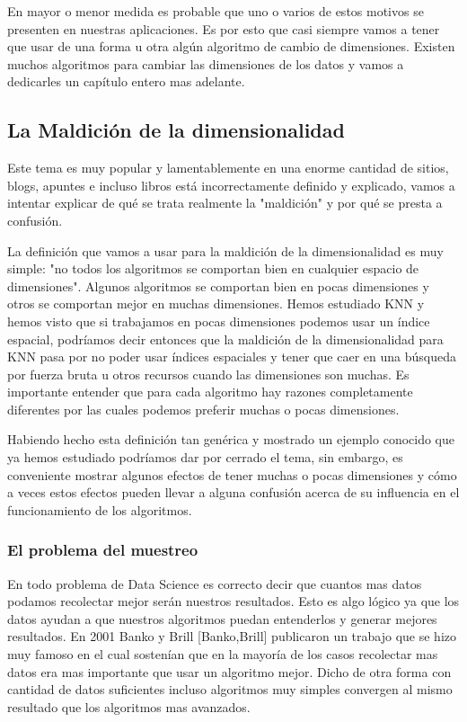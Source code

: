 En mayor o menor medida es probable que uno o varios de estos motivos se presenten en nuestras aplicaciones. Es por esto que casi siempre vamos a tener que usar de una forma u otra algún algoritmo de cambio de dimensiones. Existen muchos algoritmos para cambiar las dimensiones de los datos y vamos a dedicarles un capítulo entero mas adelante.

\subsection{La Maldición de la dimensionalidad}

Este tema es muy popular y lamentablemente en una enorme cantidad de sitios, blogs, apuntes e incluso libros está incorrectamente definido y explicado, vamos a intentar explicar de qué se trata realmente la "maldición" y por qué se presta a confusión. 

La definición que vamos a usar para la maldición de la dimensionalidad es muy simple: "no todos los algoritmos se comportan bien en cualquier espacio de dimensiones". Algunos algoritmos se comportan bien en pocas dimensiones y otros se comportan mejor en muchas dimensiones. Hemos estudiado KNN y hemos visto que si trabajamos en pocas dimensiones podemos usar un índice espacial, podríamos decir entonces que la maldición de la dimensionalidad para KNN pasa por no poder usar índices espaciales y tener que caer en una búsqueda por fuerza bruta u otros recursos cuando las dimensiones son muchas. Es importante entender que para cada algoritmo hay razones completamente diferentes por las cuales podemos preferir muchas o pocas dimensiones. 

Habiendo hecho esta definición tan genérica y mostrado un ejemplo conocido que ya hemos estudiado podríamos dar por cerrado el tema, sin embargo, es conveniente mostrar algunos efectos de tener muchas o pocas dimensiones y cómo a veces estos efectos pueden llevar a alguna confusión acerca de su influencia en el funcionamiento de los algoritmos.

\subsubsection{El problema del muestreo}

En todo problema de Data Science es correcto decir que cuantos mas datos podamos recolectar mejor serán nuestros resultados. Esto es algo lógico ya que los datos ayudan a que nuestros algoritmos puedan entenderlos y generar mejores resultados. En 2001 Banko y Brill [Banko,Brill] publicaron un trabajo que se hizo muy famoso en el cual sostenían que en la mayoría de los casos recolectar mas datos era mas importante que usar un algoritmo mejor. Dicho de otra forma con cantidad de datos suficientes incluso algoritmos muy simples convergen al mismo resultado que los algoritmos mas avanzados.

